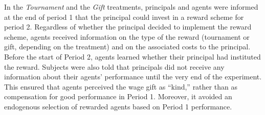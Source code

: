 In the \textit{Tournament} and the \textit{Gift} treatments, principals and agents were 
informed at the end of period 1 that the principal could  invest in a reward scheme for period 2. 
Regardless of whether the principal decided to implement the reward scheme, agents received information on the type of the reward (tournament or gift, depending on the treatment)
 and on the associated costs to the principal. 
Before the start of Period 2, agents learned whether their principal had instituted the reward.  
Subjects were also told that principals did not receive any 
information about their agents' performance until the very end of the experiment. 
This ensured that agents perceived the wage gift as ``kind,''  rather than as 
compensation for good performance in Period 1. Moreover, it avoided an endogenous 
selection of rewarded agents based on Period 1 performance.

